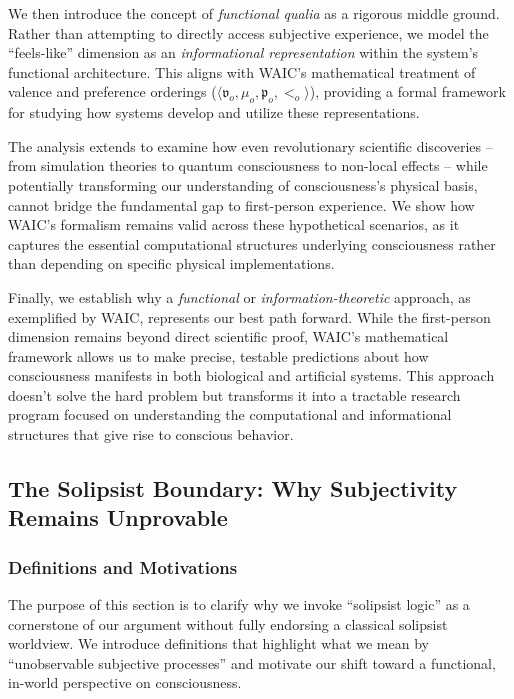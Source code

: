 \documentclass[12pt]{article}
\begin{document}
We then introduce the concept of \textit{functional qualia} as a rigorous middle ground. Rather than attempting to directly access subjective experience, we model the ``feels-like'' dimension as an \textit{informational representation} within the system's functional architecture. This aligns with WAIC's mathematical treatment of valence and preference orderings ($\langle\mathfrak{v}_o,\mu_o,\mathfrak{p}_o,<_o\rangle$), providing a formal framework for studying how systems develop and utilize these representations.

The analysis extends to examine how even revolutionary scientific discoveries -- from simulation theories to quantum consciousness to non-local effects -- while potentially transforming our understanding of consciousness's physical basis, cannot bridge the fundamental gap to first-person experience. We show how WAIC's formalism remains valid across these hypothetical scenarios, as it captures the essential computational structures underlying consciousness rather than depending on specific physical implementations.

Finally, we establish why a \textit{functional} or \textit{information-theoretic} approach, as exemplified by WAIC, represents our best path forward. While the first-person dimension remains beyond direct scientific proof, WAIC's mathematical framework allows us to make precise, testable predictions about how consciousness manifests in both biological and artificial systems. This approach doesn't solve the hard problem but transforms it into a tractable research program focused on understanding the computational and informational structures that give rise to conscious behavior.

\subsection{The Solipsist Boundary: Why Subjectivity Remains Unprovable}

\subsubsection{Definitions and Motivations}

The purpose of this section is to clarify why we invoke ``solipsist logic'' as a cornerstone of our argument without fully endorsing a classical solipsist worldview. We introduce definitions that highlight what we mean by ``unobservable subjective processes'' and motivate our shift toward a functional, in-world perspective on consciousness.
\end{document}
